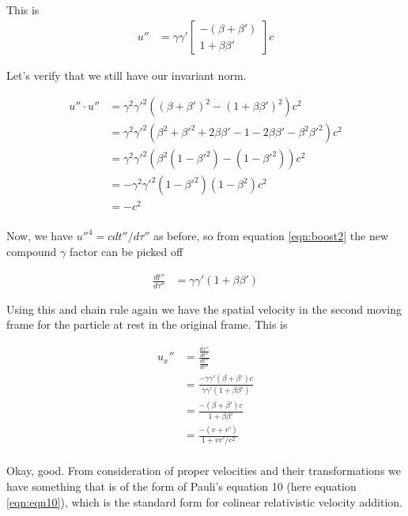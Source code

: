 \documentclass{article}
\begin{document}
This is
\begin{align}\label{eqn:boost2}
u'' &=
\gamma \gamma'
\begin{bmatrix}
-(\beta + \beta') \\
1 + \beta\beta'
\end{bmatrix}
c
\end{align}

Let's verify that we still have our invariant norm.

\begin{align*}
u'' \cdot u'' 
&=
\gamma^2 {\gamma'}^2
\left(
(\beta + \beta')^2 
-(1 + \beta\beta')^2
\right)
c^2 \\
&=
\gamma^2 {\gamma'}^2
\left(
\beta^2
+{\beta'}^2
+2 \beta\beta'
-1
-2 \beta\beta'
-\beta^2 {\beta'}^2
\right)
c^2 \\
&=
\gamma^2 {\gamma'}^2
\left(
\beta^2 (1 - {\beta'}^2)
-(1 -{\beta'}^2)
\right)
c^2 \\
&=
-\gamma^2 {\gamma'}^2 (1 -{\beta'}^2)(1 -\beta^2) c^2 \\
&=
- c^2 \\
\end{align*}

Now, we have ${u''}^4 = c dt''/d\tau''$ as before, so from equation
\ref{eqn:boost2} the new compound $\gamma$ factor can be picked off

\begin{align*}
\frac{dt''}{d\tau''} &=
\gamma \gamma'( 1 + \beta\beta' )
\end{align*}

Using this and chain rule again we have the spatial velocity in the second moving frame for the particle at rest in the original frame.  This is

\begin{align*}
u_x'' 
&=
\frac{\frac{dx''}{dt''}}{ \frac{dt''}{d\tau''} } \\
&=
\frac{-\gamma \gamma' (\beta + \beta') c}{ \gamma \gamma'( 1 + \beta\beta' ) } \\
&=
\frac{-(\beta + \beta') c}{ 1 + \beta\beta' } \\
&=
\frac{-(v + v') }{ 1 + v v'/c^2 } \\
\end{align*}

Okay, good.  From consideration of proper velocities and their transformations we have something that is of
the form of Pauli's equation 10 (here equation \ref{eqn:eqn10}), which is the standard form for colinear 
relativistic velocity addition.
\end{document}
